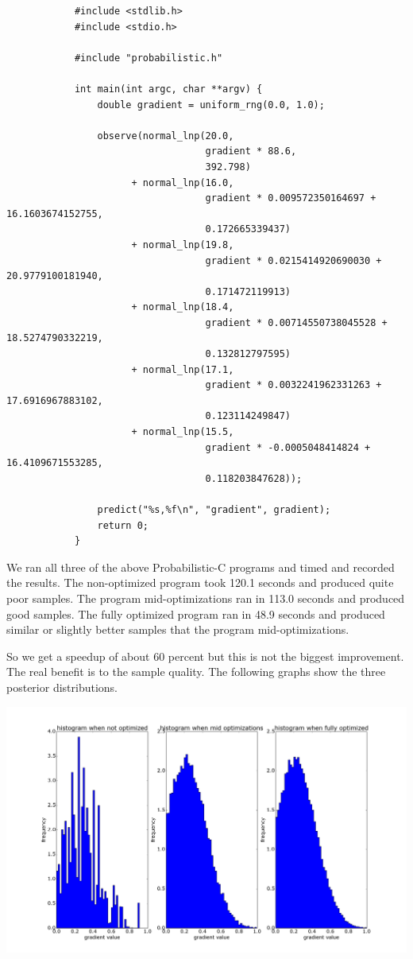 \documentclass[a4paper]{article}
\begin{document}
\begin{center}
	\begin{varwidth}{\linewidth}
		\small
		\begin{verbatim}
			#include <stdlib.h>
			#include <stdio.h>

			#include "probabilistic.h"

			int main(int argc, char **argv) {
			    double gradient = uniform_rng(0.0, 1.0);

			    observe(normal_lnp(20.0,
			                       gradient * 88.6,
			                       392.798)
			          + normal_lnp(16.0,
			                       gradient * 0.009572350164697 + 16.1603674152755,
			                       0.172665339437)
			          + normal_lnp(19.8,
			                       gradient * 0.0215414920690030 + 20.9779100181940,
			                       0.171472119913)
			          + normal_lnp(18.4,
			                       gradient * 0.00714550738045528 + 18.5274790332219,
			                       0.132812797595)
			          + normal_lnp(17.1,
			                       gradient * 0.0032241962331263 + 17.6916967883102,
			                       0.123114249847)
			          + normal_lnp(15.5,
			                       gradient * -0.0005048414824 + 16.4109671553285,
			                       0.118203847628));
			    
			    predict("%s,%f\n", "gradient", gradient);
			    return 0;
			}
		\end{verbatim}
	\end{varwidth}
\end{center}

We ran all three of the above Probabilistic-C programs and timed and recorded the results. The non-optimized program took 120.1 seconds and produced quite poor samples. The program mid-optimizations ran in 113.0 seconds and produced good samples. The fully optimized program ran in 48.9 seconds and produced similar or slightly better samples that the program mid-optimizations.

So we get a speedup of about 60 percent but this is not the biggest improvement. The real benefit is to the sample quality. The following graphs show the three posterior distributions.

\centerline{\includegraphics[width=16cm]{images/crickets.png}}
\end{document}
